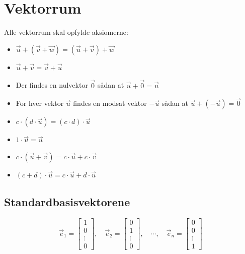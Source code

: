 \section{Vektorrum}
Alle vektorrum skal opfylde aksiomerne:
\begin{itemize}
    \item \( \vec{u} + (\vec{v} + \vec{w}) = (\vec{u} + \vec{v}) + \vec{w} \)
    \item \( \vec{u} + \vec{v} = \vec{v} + \vec{u} \)
    \item Der findes en nulvektor \( \vec{0} \) sådan at \( \vec{u} + \vec{0} = \vec{u} \)
    \item For hver vektor \( \vec{u} \) findes en modsat vektor \( -\vec{u} \) sådan at \( \vec{u} + (-\vec{u}) = \vec{0} \)
    \item \( c \cdot (d \cdot \vec{u}) = (c \cdot d) \cdot \vec{u} \)
    \item \( 1 \cdot \vec{u} = \vec{u} \)
    \item \( c \cdot (\vec{u} + \vec{v}) = c \cdot \vec{u} + c \cdot \vec{v} \)
    \item \( (c + d) \cdot \vec{u} = c \cdot \vec{u} + d \cdot \vec{u} \)
\end{itemize}

\subsection{Standardbasisvektorene}
\[
    \vec e_1 =
    \begin{bmatrix}
        1 \\ 0 \\ \vdots \\ 0
    \end{bmatrix}, \quad
    \vec e_2 =
    \begin{bmatrix}
        0 \\ 1 \\ \vdots \\ 0
    \end{bmatrix}, \quad
    \cdots, \quad
    \vec e_n =
    \begin{bmatrix}
        0 \\ 0 \\ \vdots \\ 1
    \end{bmatrix}
\]


